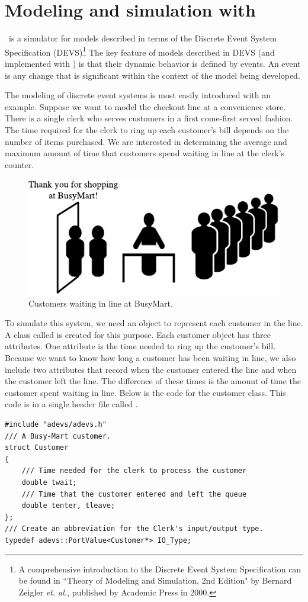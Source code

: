 \chapter{Modeling and simulation with \adevs}
\label{chapter:intro}
\adevs\ is a simulator for models described in terms of the Discrete Event System Specification (DEVS)\footnote{A comprehensive introduction to the Discrete Event System Specification can be found in ``Theory of Modeling and Simulation, 2nd Edition" by Bernard Zeigler \textit{et. al.}, published by Academic Press in 2000.} The key feature of models described in DEVS (and implemented with \adevs) is that their dynamic behavior is defined by events. An event is any change that is significant within the context of the model being developed.

The modeling of discrete event systems is most easily introduced with an example. Suppose we want to model the checkout line at a convenience store. There is a single clerk who serves customers in a first come-first served fashion. The time required for the clerk to ring up each customer's bill depends on the number of items purchased. We are interested in determining the average and maximum amount of time that customers spend waiting in line at the clerk's counter.
\begin{figure}[ht]
\centering
\includegraphics{intro_figs/busy_mart.pdf}
\caption{Customers waiting in line at BusyMart.}
\label{fig:busy_mart}
\end{figure}

To simulate this system, we need an object to represent each customer in the line. A class called  is created for this purpose. Each customer object has three attributes. One attribute is the time needed to ring up the customer's bill. Because we want to know how long a customer has been waiting in line, we also include two attributes that record when the customer entered the line and when the customer left the line. The difference of these times is the amount of time the customer spent waiting in line. Below is the code for the customer class. This code is in a single header file called .
\begin{verbatim}
#include "adevs/adevs.h"
/// A Busy-Mart customer.
struct Customer
{
    /// Time needed for the clerk to process the customer
    double twait;
    /// Time that the customer entered and left the queue
    double tenter, tleave;
};
/// Create an abbreviation for the Clerk's input/output type.
typedef adevs::PortValue<Customer*> IO_Type;
\end{verbatim}

